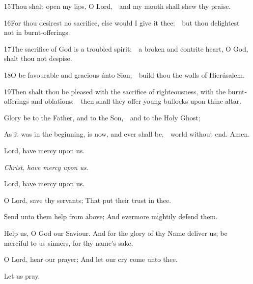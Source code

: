 15\enspace Thou shalt open my lips, O Lord,\ \star\ and my mouth shall shew thy praise.

16\enspace For thou desirest no sacrifice, else would I give it thee;\ \star\ but thou delightest not in burnt-offerings.

17\enspace The sacrifice of God is a troubled spirit:\ \star\ a broken and contrite heart, O God, shalt thou not despise.

18\enspace O be favourable and gracious únto Sion;\ \star\ build thou the walls of Hierúsalem.

19\enspace Then shalt thou be pleased with the sacrifice of righteousness, with the burnt-offerings and oblations;\ \star\ then shall they offer young bullocks upon thine altar.

Glory be to the Father, and to the Son,\ \star\ and to the Holy Ghost;

As it was in the beginning, is now, and ever shall be,\ \star\ world without end. Amen.

\medskip

\centerline{Lord, have mercy upon us.}
\centerline{\emph{Christ, have mercy upon us.}}
\centerline{Lord, have mercy upon us.}

\smallskip
\ourFather


\V O Lord, save thy servants; \R That put their trust in thee.

\V Send unto them help from above; \R And evermore mightily defend them.

\V Help us, O God our Saviour. \R And for the glory of thy Name deliver us; be merciful to us sinners, for thy name’s sake.

\V O Lord, hear our prayer; \R And let our cry come unto thee.

\centerline{Let us pray.}

\smallskip



